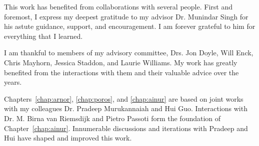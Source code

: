 \begin{acknowledgements}

This work has benefited from collaborations with several people.
First and foremost, I express my deepest gratitude to my advisor Dr. Munindar Singh for his astute guidance, support, and encouragement. 
I am forever grateful to him for everything that I learned. 

I am thankful to members of my advisory committee, Drs. Jon Doyle, Will Enck, Chris Mayhorn, Jessica Staddon, and Laurie Williams. 
My work has greatly benefited from the interactions with them and their valuable advice over the years. 

Chapters~\ref{chap:arnor}, \ref{chap:poros}, and \ref{chap:ainur} are based on joint
works with my colleagues Dr. Pradeep Murukannaiah and Hui Guo. 
Interactions with Dr. M. Birna van Riemsdijk and Pietro Passoti form the foundation of Chapter~\ref{chap:ainur}.
Innumerable discussions and iterations with Pradeep and Hui have shaped and improved this work. 


\end{acknowledgements}
